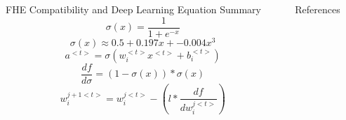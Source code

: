 \documentclass{beamer}
\begin{document}
\begin{frame}
    \begin{columns}
      \begin{column}{0.3\textwidth}
        \begin{block}{FHE Compatibility and Deep Learning Equation Summary}
          \begin{equation}
            \label{sigmoid}
            \sigma(x) = \frac{1}{1+e^{-x}}
          \end{equation}
          \begin{equation}
            \label{sigmoid_approx}
            \sigma(x) \approx 0.5 + 0.197x + -0.004x^3
          \end{equation}
          \begin{equation}
            \label{cnn_activation}
            a^{<t>}=\sigma(w_{i}^{<t>}x^{<t>}+b_i^{<t>})
          \end{equation}
          \begin{equation}
            \label{gradient}
            \frac{df}{d\sigma} = (1-\sigma(x)) * \sigma(x)
          \end{equation}
          \begin{equation}
            \label{weight_update}
            w_i^{j+1<t>} = w_i^{j<t>} - (l * \frac{df}{dw_i^{j<t>}})
          \end{equation}
        \end{block}
      \end{column}
      \begin{column}{0.3\textwidth}
        \begin{block}{References}
          \printbibliography
        \end{block}
      \end{column}
    \end{columns}
  \end{frame}
\end{document}
